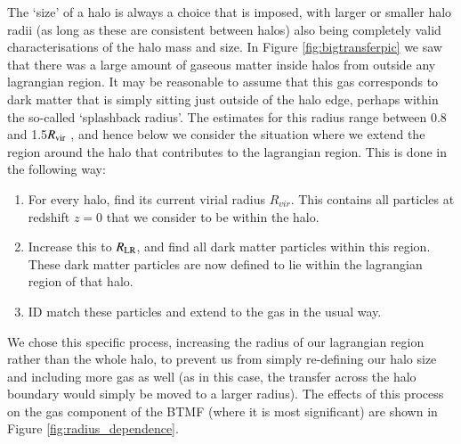 The `size' of a halo is always a choice that is imposed, with larger or
smaller halo radii (as long as these are consistent between halos) also being
completely valid characterisations of the halo mass and size. In Figure
\ref{fig:bigtransferpic} we saw that there was a large amount of gaseous matter
inside halos from outside any lagrangian region. It may be reasonable to assume
that this gas corresponds to dark matter that is simply sitting just outside of
the halo edge, perhaps within the so-called `splashback radius'. The estimates
for this radius range between 0.8 and 1.5$R_{\rm vir}$ \citep{More2015}, and hence
below we consider the situation where we extend the region around the halo that
contributes to the lagrangian region. This is done in the following way:
\begin{enumerate}
	\item For every halo, find its current virial radius $R_{vir}$. This contains
	      all particles at redshift $z=0$ that we consider to be within the halo.
	\item Increase this to $R_{\rm LR}$, and find all dark matter particles within
		  this region. These dark matter particles are now defined to lie within
		  the lagrangian region of that halo.
	\item ID match these particles and extend to the gas in the usual way.
\end{enumerate}
We chose this specific process, increasing the radius of our lagrangian region
rather than the whole halo, to prevent us from simply re-defining our halo size
and including more gas as well (as in this case, the transfer across the halo
boundary would simply be moved to a larger radius). The effects of this process
on the gas component of the BTMF (where it is most significant) are shown
in Figure \ref{fig:radius_dependence}.

